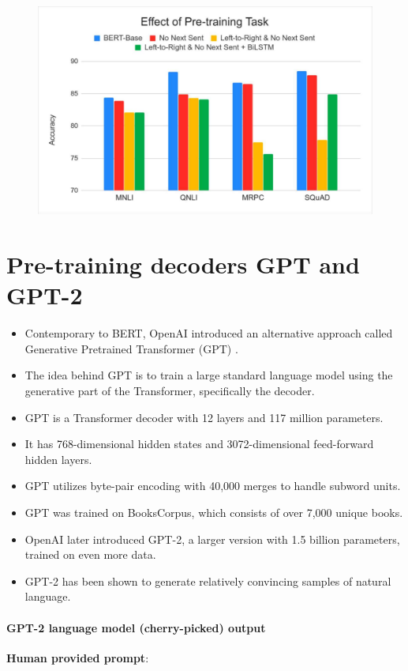  \begin{figure}[h]
        	\includegraphics[scale = 0.2]{pics/BERTeffect.png}
        \end{figure}  


\section{Pre-training decoders GPT and GPT-2}

\begin{itemize}
\item Contemporary to BERT, OpenAI introduced an alternative approach called Generative Pretrained Transformer (GPT) \cite{radford2018improving}.
\item The idea behind GPT is to train a large standard language model using the generative part of the Transformer, specifically the decoder.
\item GPT is a Transformer decoder with 12 layers and 117 million parameters.
\item It has 768-dimensional hidden states and 3072-dimensional feed-forward hidden layers.
\item GPT utilizes byte-pair encoding with 40,000 merges to handle subword units.
\item GPT was trained on BooksCorpus, which consists of over 7,000 unique books.
\item OpenAI later introduced GPT-2, a larger version with 1.5 billion parameters, trained on even more data.
\item GPT-2 has been shown to generate relatively convincing samples of natural language.
\end{itemize}


\paragraph{GPT-2 language model (cherry-picked) output}
\textbf{Human provided prompt}:

